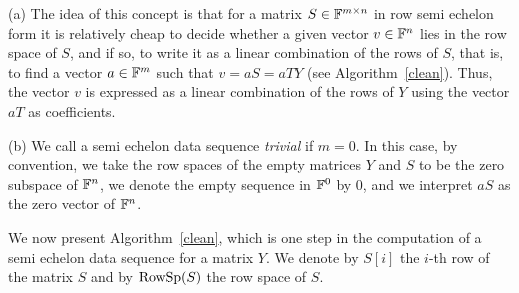 \begin{Rem}\label{rem:seds}
(a) The idea of this concept is that for a matrix 
$S \in \mathbb{F}^{m\times n}$ in row semi echelon form it is relatively
cheap to decide whether a given vector $v \in \mathbb{F}^n$ lies in the row
space of $S$, and if so, to write it as a linear combination of the
rows of $S$, that is, to find a vector $a \in \mathbb{F}^m$ such that
$v = aS = aTY$ (see Algorithm~\ref{clean}). Thus, the vector
$v$ is expressed as a linear combination of the rows of $Y$
using the vector $aT$ as coefficients.

(b) We call a semi echelon data sequence \emph{trivial} if $m=0$.
In this case, by convention, we take the row spaces of
the empty matrices $Y$ and $S$ to be the zero subspace of $\mathbb{F}^n$, we
denote the empty sequence in $\mathbb{F}^0$ by $0$, and we interpret $aS$ as
the zero vector of $\mathbb{F}^n$.
\end{Rem}

\medskip
We now present Algorithm~\ref{clean}, which is one step in the
computation of a semi echelon data sequence for a matrix $Y$. We
denote by $S[i]$ the $i$-th row of the matrix $S$ and by $\mathrm{RowSp}(S)$ the 
row space of $S$.


